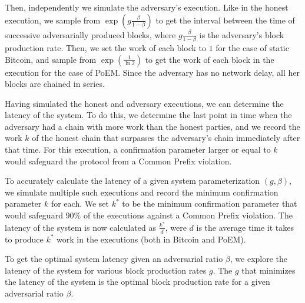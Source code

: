 Then, independently we simulate the adversary's execution. Like in the honest execution, we sample from $\exp(g\frac{\beta}{1 - \beta})$
to get the interval between the time of successive adversarially produced blocks, where $g\frac{\beta}{1 - \beta}$ is the adversary's block production rate.
Then, we set the work of each block to $1$ for the case of static Bitcoin, and sample from $\exp(\frac{1}{\ln2})$ to get the work of each block in the execution for the case of PoEM.
Since the adversary has no network delay, all her blocks are chained in series.

Having simulated the honest and adversary executions, we can determine the latency of the system.
To do this, we determine the last point in time when the adversary had a chain with more work than the honest parties,
and we record the work $k$ of the honest chain that surpasses the adversary's chain immediately after that time.
For this execution, a confirmation parameter larger or equal to $k$ would safeguard the protocol from a Common Prefix violation.

To accurately calculate the latency of a given system parameterization $(g, \beta)$, we simulate multiple such executions and record the minimum confirmation
parameter $k$ for each. We set $k^*$ to be the minimum confirmation parameter that would safeguard $90\%$ of the executions against a Common Prefix violation.
The latency of the system is now calculated as $\frac{k^*}{d}$, were $d$ is the average time it takes to produce $k^*$ work in the executions
(both in Bitcoin and PoEM).

To get the optimal system latency given an adversarial ratio $\beta$, we explore the latency of the system for various block production rates $g$.
The $g$ that minimizes the latency of the system is the optimal block production rate for a given adversarial ratio $\beta$.

